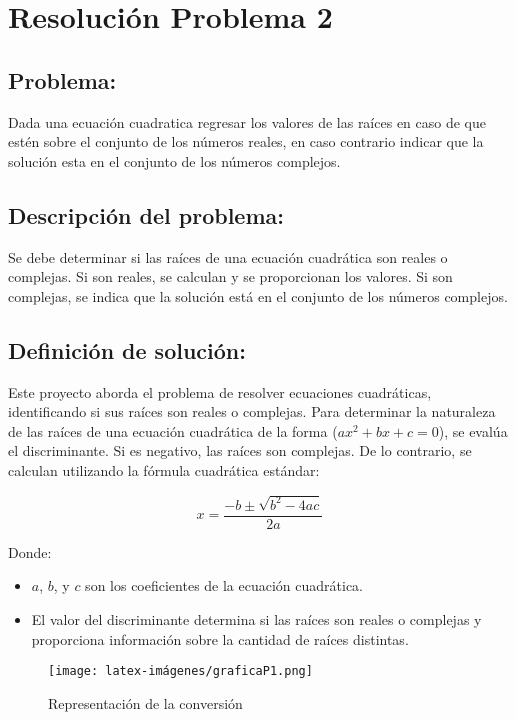 \section{Resolución Problema 2} 
\subsection{Problema:}
Dada una ecuación cuadratica regresar los valores de las raíces en caso de que estén sobre el conjunto de los números reales, en caso contrario indicar que la solución esta en el conjunto de los números complejos. 

\subsection{\textbf{Descripción del problema:}}
Se debe determinar si las raíces de una ecuación cuadrática 
son reales o complejas. Si son reales, se calculan y 
se proporcionan los valores. Si son complejas, se 
indica que la solución está en el conjunto de los números complejos.

\subsection{\textbf{Definición de solución:}}
Este proyecto aborda el problema de resolver ecuaciones cuadráticas, identificando si sus raíces son reales o complejas. 
Para determinar la naturaleza de las raíces de una ecuación cuadrática de la forma  (\(ax^2 + bx + c = 0\)), se evalúa el discriminante. Si es negativo, las raíces son complejas. De lo contrario, se calculan utilizando la fórmula cuadrática estándar:

\[ x = \frac{-b \pm \sqrt{b^2 - 4ac}}{2a} \]

Donde:
\begin{itemize}
    \item \(a\), \(b\), y \(c\) son los coeficientes de la ecuación cuadrática.
    \item El valor del discriminante determina si las raíces son reales o complejas y proporciona información sobre la cantidad de raíces distintas.
\end{itemize}


\begin{figure}[h!]
    \centering
    \texttt{[image: latex-imágenes/graficaP1.png]}
    \caption{Representación de la conversión}
    \label{fig: Grafica Ecuacion Recta}
\end{figure}

